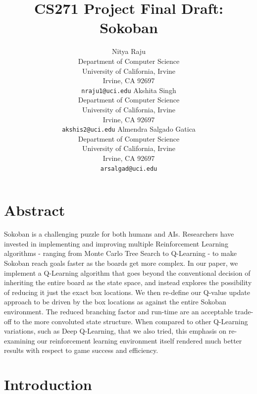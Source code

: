 \documentclass{article}
\title{CS271 Project Final Draft: Sokoban}
\author{
  Nitya Raju\\
  Department of Computer Science\\
  University of California, Irvine\\
  Irvine, CA 92697\\
  \texttt{nraju1@uci.edu} 
   \And
  Akshita Singh \\
  Department of Computer Science\\
  University of California, Irvine\\
  Irvine, CA 92697\\
  \texttt{akshis2@uci.edu} 
   \And
  Almendra Salgado Gatica \\
  Department of Computer Science\\
  University of California, Irvine\\
  Irvine, CA 92697\\
  \texttt{arsalgad@uci.edu} 
}
\begin{document}
\maketitle



\section{Abstract}
Sokoban is a challenging puzzle for both humans and AIs. Researchers have invested in implementing and improving multiple Reinforcement Learning algorithms - ranging from Monte Carlo Tree Search to Q-Learning - to make Sokoban reach goals faster as the boards get more complex. In our paper, we implement a Q-Learning algorithm that goes beyond the conventional decision of inheriting the entire board as the state space, and instead explores the possibility of reducing it just the exact box locations. We then re-define our Q-value update approach to be driven by the box locations as against the entire Sokoban environment. The reduced branching factor and run-time are an acceptable trade-off to the more convoluted state structure. When compared to other Q-Learning variations, such as Deep Q-Learning, that we also tried, this emphasis on re-examining our reinforcement learning environment itself rendered much better results with respect to game success and efficiency. 



\section{Introduction}
\end{document}
